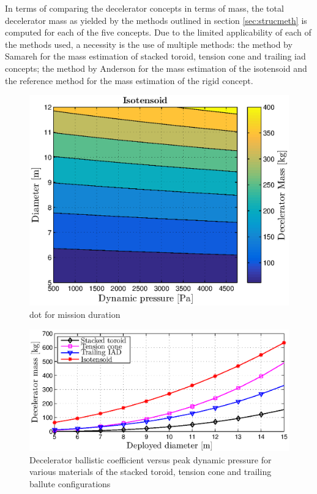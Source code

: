 In terms of comparing the decelerator concepts in terms of mass, the total decelerator mass as yielded by the methods outlined in section \ref{sec:strucmeth} is computed for each of the five concepts. Due to the limited applicability of each of the methods used, a necessity is the use of multiple methods: the method by Samareh \cite{Samareh2011} for the mass estimation of stacked toroid, tension cone and trailing \gls{iad} concepts; the method by Anderson \cite{Anderson1969} for the mass estimation of the isotensoid and the reference method for the mass estimation of the rigid concept. 

\begin{figure}[H]
\centering
\includegraphics[width = 1.0\textwidth]{Figure/ISO_comp.eps}
\caption{\acrlong{dot} for mission duration}
\label{fig:dotduration}
\end{figure}


\begin{figure}[H]
\includegraphics[width = 1.0\textwidth]{Figure/mass_dia.eps}
\caption{Decelerator ballistic coefficient versus peak dynamic pressure for various materials of the stacked toroid, tension cone and trailing ballute configurations}
\label{fig:all_mat}
\end{figure}
